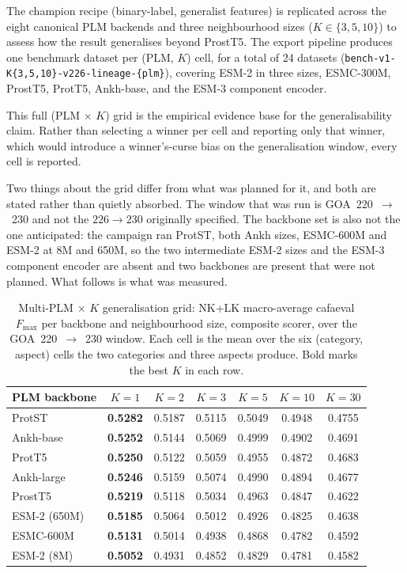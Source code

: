 The champion recipe (binary-label, generalist features) is replicated across
the eight canonical PLM backends and three neighbourhood sizes
($K \in \{3, 5, 10\}$) to assess how the result generalises beyond ProstT5.
The export pipeline produces one benchmark dataset per (PLM, $K$) cell, for a
total of 24 datasets (\texttt{bench-v1-K\{3,5,10\}-v226-lineage-\{plm\}}),
covering ESM-2 in three sizes, ESMC-300M, ProstT5, ProtT5, Ankh-base, and the
ESM-3 component encoder.

This full (PLM $\times$ $K$) grid is the empirical evidence base for the
generalisability claim. Rather than selecting a winner per cell and reporting
only that winner, which would introduce a winner's-curse bias on the
generalisation window, every cell is reported.

Two things about the grid differ from what was planned for it, and both are
stated rather than quietly absorbed. The window that was run is
GOA~220~$\to$~230 and not the $226 \to 230$ originally specified. The backbone
set is also not the one anticipated: the campaign ran ProtST, both Ankh sizes,
ESMC-600M and ESM-2 at 8M and 650M, so the two intermediate ESM-2 sizes and the
ESM-3 component encoder are absent and two backbones are present that were not
planned. What follows is what was measured.

\begin{table}[htbp]
  \centering
  \caption[Multi-PLM x K generalisation grid]{%
    Multi-PLM $\times$ $K$ generalisation grid: NK+LK macro-average cafaeval
    $F_{\max}$ per backbone and neighbourhood size, composite scorer, over the
    GOA~220~$\to$~230 window. Each cell is the mean over the six
    (category, aspect) cells the two categories and three aspects produce.
    Bold marks the best $K$ in each row.}
  \label{tab:exp9-multiplm-grid}
  \begin{tabular}{l cccccc}
    \toprule
    \textbf{PLM backbone} & $K{=}1$ & $K{=}2$ & $K{=}3$ & $K{=}5$ & $K{=}10$ & $K{=}30$ \\
    \midrule
    ProtST        & \textbf{0.5282} & 0.5187 & 0.5115 & 0.5049 & 0.4948 & 0.4755 \\
    Ankh-base     & \textbf{0.5252} & 0.5144 & 0.5069 & 0.4999 & 0.4902 & 0.4691 \\
    ProtT5        & \textbf{0.5250} & 0.5122 & 0.5059 & 0.4955 & 0.4872 & 0.4683 \\
    Ankh-large    & \textbf{0.5246} & 0.5159 & 0.5074 & 0.4990 & 0.4894 & 0.4677 \\
    ProstT5       & \textbf{0.5219} & 0.5118 & 0.5034 & 0.4963 & 0.4847 & 0.4622 \\
    ESM-2 (650M)  & \textbf{0.5185} & 0.5064 & 0.5012 & 0.4926 & 0.4825 & 0.4638 \\
    ESMC-600M     & \textbf{0.5131} & 0.5014 & 0.4938 & 0.4868 & 0.4782 & 0.4592 \\
    ESM-2 (8M)    & \textbf{0.5052} & 0.4931 & 0.4852 & 0.4829 & 0.4781 & 0.4582 \\
    \bottomrule
  \end{tabular}
\end{table}


